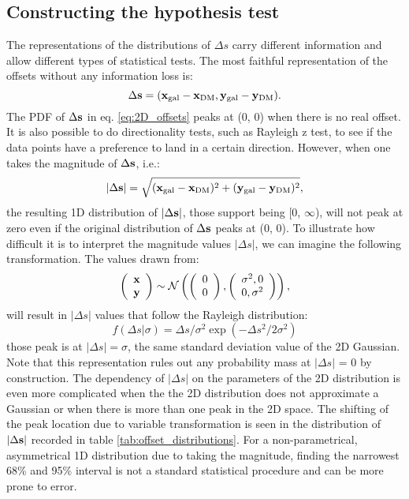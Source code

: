 \subsection{Constructing the hypothesis test} 

The representations of the distributions of $\Delta s$ carry
different information and allow different types of statistical tests. 
The most faithful representation of the offsets without any information loss
is:
\begin{equation}
	\Delta {\bf s} = ({\bf x}_{\rm gal} - {\bf x}_{\rm DM}, 
	{\bf y}_{\rm gal} - {\bf y}_{\rm DM} ).
	\label{eq:2D_offsets}
\end{equation}
The PDF of $\Delta {\bf s}$ in eq. \ref{eq:2D_offsets} peaks at (0, 0) when
there is no real offset. It is also possible to do directionality tests,
such as Rayleigh z test, to see if the data points have a preference to land in
a certain direction.
However, when one takes the magnitude of $\Delta {\bf s}$, i.e.:
\begin{equation}
	|\Delta {\bf s}| = \sqrt{({\bf x}_{\rm gal} - {\bf x}_{\rm DM})^2 + 
	({\bf y}_{\rm gal} - {\bf y}_{\rm DM})^2},
	\label{eq:magnitude_offsets}
\end{equation}
the resulting 1D distribution of $|\Delta {\bf s}|$, 
those support being [0, $\infty$),
will not peak at zero even if the original
distribution of $\Delta {\bf s}$ peaks at (0, 0). 
To illustrate how difficult it is to interpret the magnitude values $|\Delta
s|$,  
we can imagine the following transformation.
The values drawn from: 
\begin{equation}
	\left(\begin{array}{c}
			\bf{x}\\
			\bf{y}
		\end{array}
	\right) \sim \mathcal{N}\left(
	\left(
		\begin{array}{c}
			0 \\
			0
		\end{array}
	\right),
	\left(\begin{array}{cc}
		\sigma^2, 0 \\
		0, \sigma^2
	 \end{array}
	\right)
\right),
\end{equation}
will result in $|\Delta s|$ values that follow the Rayleigh distribution:
\begin{equation}
	f(\Delta s | \sigma) = \Delta s /  \sigma^2 \exp(-\Delta s^2 / 2 \sigma^2)
\end{equation}
those peak is at $|\Delta s| = \sigma$, the same standard deviation value of the 2D
Gaussian. Note that this representation  
rules out any probability mass at $|\Delta s|$ = 0 by construction. 
The dependency of $|\Delta s|$ on the parameters of
the 2D distribution is even more
complicated when the the 2D distribution does not approximate a Gaussian 
or when there is more than one peak in the 2D space. 
The shifting of the peak location due to variable transformation 
is seen in the distribution of $|\Delta {\bf s}|$ recorded in table
\ref{tab:offset_distributions}.
For a non-parametrical, asymmetrical 1D distribution due to taking the magnitude, 
finding the narrowest 68\% and 95\% interval
is not a standard statistical procedure and can be more prone to error.

